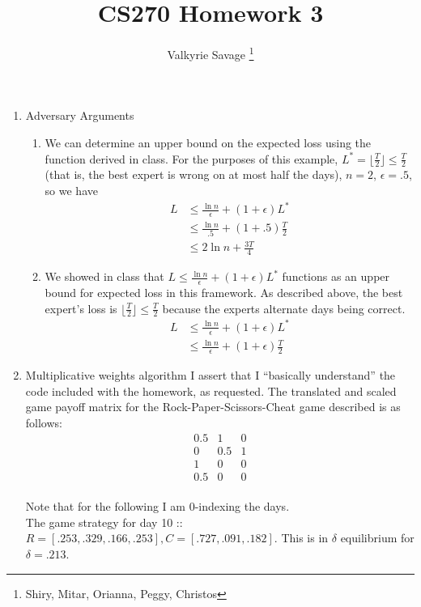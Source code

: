 \documentclass[a4paper]{article}
\title{CS270 Homework 3}
\author{Valkyrie Savage \thanks{Shiry, Mitar, Orianna, Peggy, Christos}}
\begin{document}
\maketitle

\begin{enumerate}
\item Adversary Arguments
	\begin{enumerate}
	\item We can determine an upper bound on the expected loss using the function derived in class.  For the purposes of this example, $L^*=\lfloor \frac{T}{2} \rfloor \leq \frac{T}{2}$ (that is, the best expert is wrong on at most half the days), $n=2$, $\epsilon = .5$, so we have
		\begin{align*}
			L &\leq \frac{\ln n}{\epsilon} + (1 + \epsilon) L^* \\
			&\leq \frac{\ln n}{.5} + (1 + .5)\frac{T}{2} \\
			&\leq 2 \ln n + \frac{3T}{4}
		\end{align*}
	\item We showed in class that $L \leq \frac{\ln n}{\epsilon} + (1 + \epsilon) L^*$ functions as an upper bound for expected loss in this framework.  As described above, the best expert's loss is $\lfloor \frac{T}{2} \rfloor \leq \frac{T}{2}$ because the experts alternate days being correct.
		\begin{align*}
			L &\leq \frac{\ln n}{\epsilon} + (1 + \epsilon) L^* \\
			&\leq \frac{\ln n}{\epsilon} + (1 + \epsilon) \frac{T}{2}
		\end{align*}
	\end{enumerate}
\item Multiplicative weights algorithm
I assert that I ``basically understand'' the code included with the homework, as requested.
The translated and scaled game payoff matrix for the Rock-Paper-Scissors-Cheat game described is as follows:
\[ \begin{array}{ccc}
0.5 & 1 & 0 \\
0 & 0.5 & 1 \\
1 & 0 & 0 \\
0.5 & 0 & 0 \end{array} \]\\
Note that for the following I am 0-indexing the days. \\
The game strategy for day 10 :: $R = [.253, .329, .166, .253], C = [.727, .091, .182]$.  This is in $\delta$ equilibrium for $\delta = .213$.\\

\end{enumerate}
\end{document}
